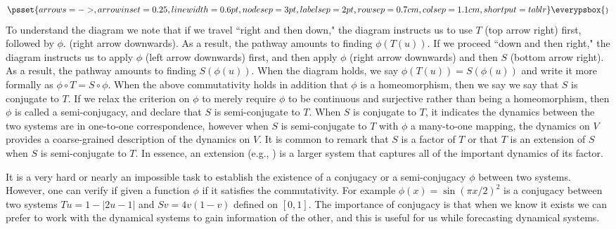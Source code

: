 \documentclass[12 pt]{article}
\begin{document}
\begin{equation}  \label{eqn_conjugacy}
    \psset{arrows=->, arrowinset=0.25, linewidth=0.6pt, nodesep=3pt, labelsep=2pt, rowsep=0.7cm, colsep = 1.1cm, shortput =tablr}
 \everypsbox{\scriptstyle}
\end{equation} 
To understand the diagram we note that if we travel ``right and then down," the diagram instructs us to use $T$ (top arrow right) first, followed by $\phi$. (right arrow downwards). As a result, the pathway amounts to finding $\phi(T(u))$. If we proceed ``down and then right," the diagram instructs us to apply $\phi$ (left arrow downwards) first, and then apply $\phi$ (right arrow downwards) and then $S$ (bottom arrow right). As a result, the pathway amounts to finding  $S(\phi(u))$. When the diagram holds, we say 
$\phi(T(u))= S(\phi(u))$ and write it more formally as
$\phi \circ T=S\circ \phi$.
When the above commutativity holds in addition that $\phi$ is a homeomorphism, then we say we say that  $S$ is conjugate to $T$.  
If we relax the criterion on $\phi$ to merely require $\phi$ to be continuous and surjective rather than being a homeomorphism, then $\phi$ is called a semi-conjugacy, and declare that $S$ is semi-conjugate to $T$. When $S$ is conjugate to $T$, it indicates the dynamics between the two systems are in one-to-one correspondence, however when $S$ is semi-conjugate to $T$ with $\phi$ a many-to-one mapping, the dynamics on $V$ provides a coarse-grained description of the dynamics on $V$. It is common to remark that $S$ is a factor of $T$ or that $T$ is an extension of $S$ when $S$ is semi-conjugate to $T$. In essence, an extension (e.g., \cite{de2013elements}) is a larger system that captures all of the important dynamics of its factor.

It is a very hard or nearly an impossible task to establish the existence of a conjugacy or a semi-conjugacy $\phi$ between two systems. However, one can verify if given a function $\phi$ if it satisfies the commutativity.  For example $\phi(x)=\sin(\pi x/2)^2$ is a conjugacy between two systems $Tu=1-|2u-1|$ and $Sv=4v(1-v)$  defined on $[0,1]$.  The importance of conjugacy is that when we know it exists we can prefer to work with  the dynamical systems to gain information of the other, and this is useful for us while forecasting dynamical systems.  






\vspace{-1cm}


\end{document}
